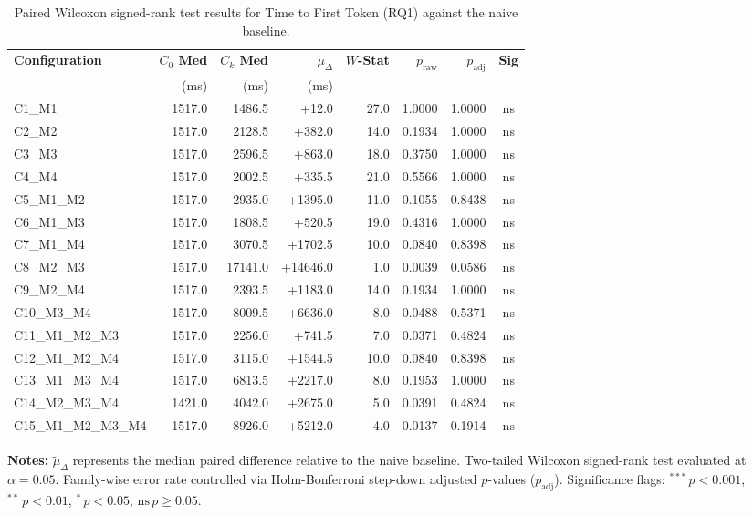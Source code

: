 \begin{table}[!htbp]
\centering
\small
\caption{Paired Wilcoxon signed-rank test results for Time to First Token (RQ1) against the naive baseline.}
\label{tab:wilcoxon_rq1_ttft}
\begin{tabular*}{\textwidth}{@{\extracolsep{\fill}} l r r r r r r c @{}}
\toprule
\textbf{Configuration} & \textbf{$C_0$ Med} & \textbf{$C_k$ Med} & \textbf{$\tilde{\mu}_\Delta$} & \textbf{$W$-Stat} & \textbf{$p_{\text{raw}}$} & \textbf{$p_{\text{adj}}$} & \textbf{Sig} \\
 & \scriptsize{(ms)} & \scriptsize{(ms)} & \scriptsize{(ms)} & & & & \\
\midrule
C1\_M1 & 1517.0 & 1486.5 & +12.0 & 27.0 & 1.0000 & 1.0000 & ns \\
C2\_M2 & 1517.0 & 2128.5 & +382.0 & 14.0 & 0.1934 & 1.0000 & ns \\
C3\_M3 & 1517.0 & 2596.5 & +863.0 & 18.0 & 0.3750 & 1.0000 & ns \\
C4\_M4 & 1517.0 & 2002.5 & +335.5 & 21.0 & 0.5566 & 1.0000 & ns \\
C5\_M1\_M2 & 1517.0 & 2935.0 & +1395.0 & 11.0 & 0.1055 & 0.8438 & ns \\
C6\_M1\_M3 & 1517.0 & 1808.5 & +520.5 & 19.0 & 0.4316 & 1.0000 & ns \\
C7\_M1\_M4 & 1517.0 & 3070.5 & +1702.5 & 10.0 & 0.0840 & 0.8398 & ns \\
C8\_M2\_M3 & 1517.0 & 17141.0 & +14646.0 & 1.0 & 0.0039 & 0.0586 & ns \\
C9\_M2\_M4 & 1517.0 & 2393.5 & +1183.0 & 14.0 & 0.1934 & 1.0000 & ns \\
C10\_M3\_M4 & 1517.0 & 8009.5 & +6636.0 & 8.0 & 0.0488 & 0.5371 & ns \\
C11\_M1\_M2\_M3 & 1517.0 & 2256.0 & +741.5 & 7.0 & 0.0371 & 0.4824 & ns \\
C12\_M1\_M2\_M4 & 1517.0 & 3115.0 & +1544.5 & 10.0 & 0.0840 & 0.8398 & ns \\
C13\_M1\_M3\_M4 & 1517.0 & 6813.5 & +2217.0 & 8.0 & 0.1953 & 1.0000 & ns \\
C14\_M2\_M3\_M4 & 1421.0 & 4042.0 & +2675.0 & 5.0 & 0.0391 & 0.4824 & ns \\
C15\_M1\_M2\_M3\_M4 & 1517.0 & 8926.0 & +5212.0 & 4.0 & 0.0137 & 0.1914 & ns \\
\bottomrule
\end{tabular*}
\vspace{0.5em}
\parbox{\textwidth}{\footnotesize
\textbf{Notes:} $\tilde{\mu}_\Delta$ represents the median paired difference relative to the naive baseline. Two-tailed Wilcoxon signed-rank test evaluated at $\alpha = 0.05$. Family-wise error rate controlled via Holm-Bonferroni step-down adjusted $p$-values ($p_{\text{adj}}$). Significance flags: $^{***}\,p < 0.001$, $^{**}\,p < 0.01$, $^{*}\,p < 0.05$, $\text{ns}\,p \ge 0.05$.}
\end{table}
